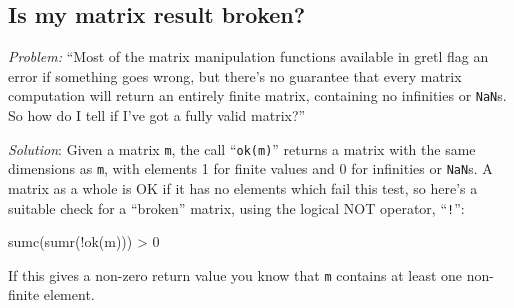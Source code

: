 \subsection{Is my matrix result broken?}
\label{sec:brokenmat}

\emph{Problem:} ``Most of the matrix manipulation functions available
in gretl flag an error if something goes wrong, but there's no
guarantee that every matrix computation will return an entirely finite
matrix, containing no infinities or \texttt{NaN}s. So how do I tell if
I've got a fully valid matrix?''

\emph{Solution}: Given a matrix \texttt{m}, the call
``\texttt{ok(m)}'' returns a matrix with the same dimensions as
\texttt{m}, with elements 1 for finite values and 0 for infinities or
\texttt{NaN}s. A matrix as a whole is OK if it has no elements which
fail this test, so here's a suitable check for a ``broken'' matrix,
using the logical NOT operator, ``\texttt{!}'':
\begin{code}
sumc(sumr(!ok(m))) > 0
\end{code}
If this gives a non-zero return value you know that \texttt{m}
contains at least one non-finite element.


